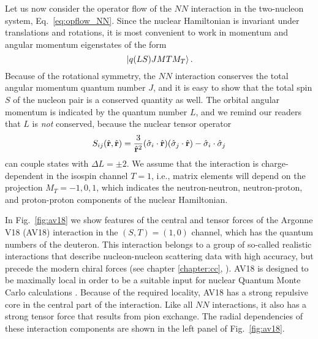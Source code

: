 {Let us now consider the operator flow of the $NN$ interaction
in the two-nucleon system, Eq.~\eqref{eq:opflow_NN}. Since the nuclear Hamiltonian is invariant
under translations and rotations, it is most convenient to work in
momentum and angular momentum eigenstates of the form
\begin{equation}
  \,|{q(LS)JMTM_T}\rangle\,.
\end{equation}
Because of the rotational symmetry, the $NN$ interaction conserves
the total angular momentum quantum number $J$, and it is easy to show 
that the total spin $S$ of the nucleon pair is a conserved quantity as 
well. The
orbital angular momentum is indicated by the quantum number $L$,
and we remind our readers that $L$ is \emph{not} conserved, because
the nuclear tensor operator
\begin{equation}
  S_{ij}(\hat{\mathbf{r}},\hat{\mathbf{r}}) = \frac{3}{\hat{\mathbf{r}}^2}(\hat{\mathbf{\sigma}}_i\cdot\hat{\mathbf{r}})(\hat{\mathbf{\sigma}}_j\cdot\hat{\mathbf{r}})-\hat{\mathbf{\sigma}}_i\cdot\hat{\mathbf{\sigma}}_{j}
\end{equation}
can couple states with $\Delta L = \pm 2$. We
assume that the interaction is charge-dependent in the isospin channel
$T=1$, i.e., matrix elements will depend on the projection $M_T=-1,0,1$, 
which indicates the neutron-neutron, neutron-proton, and proton-proton 
components of the nuclear Hamiltonian. 


In Fig.~\ref{fig:av18} we show features of the central 
and tensor forces of the Argonne V18 (AV18) interaction \cite{Wiringa:1995or}
in the $(S,T)=(1,0)$ channel, which has the quantum numbers of the deuteron. This 
interaction belongs to a group of so-called
realistic interactions that describe nucleon-nucleon scattering data
with high accuracy, but precede the modern chiral forces (see
chapter \ref{chapter:cc}, \cite{Epelbaum:2009ve,Machleidt:2011bh}). AV18
is designed to be maximally local in order to be a suitable input for
nuclear Quantum Monte Carlo calculations \cite{Carlson:2015lq,Gezerlis:2014zr,
Lynn:2016ec}. Because of the required locality, AV18 has a strong repulsive
core in the central part of the interaction. Like all $NN$ interactions,
it also has a strong tensor force that results from pion exchange. The
radial dependencies of these interaction components are shown in the left
panel of Fig.~\ref{fig:av18}. 

}
